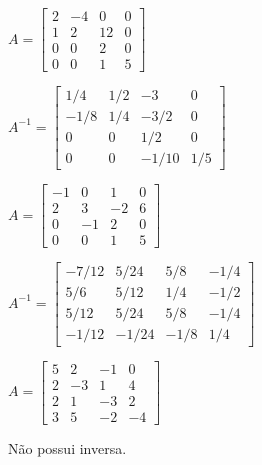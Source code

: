 \documentclass[12pt]{exam}
\begin{document}
\begin{exercicio}
    $
        A = \begin{bmatrix}
            2 & -4 & 0 & 0\\
            1 & 2 & 12 & 0\\
            0 & 0 & 2 & 0\\
            0 & 0 & 1 & 5
        \end{bmatrix}
    $
    \begin{solucao}
        $
            A^{-1} = \begin{bmatrix}
                1/4 & 1/2 & -3 & 0\\
                -1/8 & 1/4 & -3/2 & 0\\
                0 & 0 & 1/2 & 0\\
                0 & 0 & -1/10 & 1/5
            \end{bmatrix}
        $
    \end{solucao}
\end{exercicio}

\begin{exercicio}
    $
    A = \begin{bmatrix}
        -1 & 0 & 1 & 0\\
        2 & 3 & -2 & 6\\
        0 & -1 & 2 & 0\\
        0 & 0 & 1 & 5
    \end{bmatrix}
    $
    \begin{solucao}
        $
        A^{-1} = \begin{bmatrix}
            -7/12 & 5/24 & 5/8 & -1/4\\
            5/6 & 5/12 & 1/4 & -1/2\\
            5/12 & 5/24 & 5/8 & -1/4\\
            -1/12 & -1/24 & -1/8 & 1/4
        \end{bmatrix}
        $
    \end{solucao}
\end{exercicio}

\begin{exercicio}
    $
    A = \begin{bmatrix}
        5 & 2 & -1 & 0\\
        2 & -3 & 1 & 4\\
        2 & 1 & -3 & 2\\
        3 & 5 & -2 & -4
    \end{bmatrix}
    $
    \begin{solucao}
        Não possui inversa.
    \end{solucao}
\end{exercicio}
\end{document}
